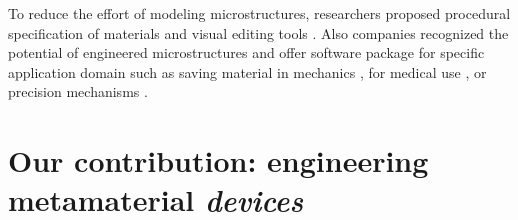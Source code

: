 {To reduce the effort of modeling microstructures, researchers proposed procedural specification of materials \cite{Vidimce2013, Chen2013, Vidimce2016} and visual editing tools \cite{Monolith2018, VoxCAD2018}. Also companies recognized the potential of engineered microstructures and offer software package for specific application domain such as saving material in mechanics \cite{AutodeskNetfabb2018}, for medical use \cite{AutodeskWithin2018}, or precision mechanisms \cite{SPACAR2018}.












\section{Our contribution: engineering metamaterial \textit{devices}}

}
